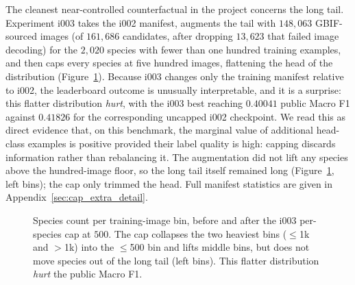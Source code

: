 The cleanest near-controlled counterfactual in the project concerns the long tail. Experiment
i003 takes the i002 manifest, augments the tail with $148{,}063$ GBIF-sourced images
(of $161{,}686$ candidates, after dropping $13{,}623$ that failed image decoding) for the
$2{,}020$ species with fewer than one hundred training examples, and then caps every species at
five hundred images, flattening the head of the distribution (Figure~\ref{fig:long_tail}).
Because i003 changes only the training manifest relative to i002, the leaderboard outcome is
unusually interpretable, and it is a surprise: this flatter distribution \emph{hurt}, with the
i003 best reaching $0.40041$ public Macro F1 against $0.41826$ for the corresponding uncapped
i002 checkpoint. We read this as direct evidence that, on this benchmark, the marginal value of
additional head-class examples is positive provided their label quality is high: capping discards
information rather than rebalancing it. The augmentation did not lift any species above the
hundred-image floor, so the long tail itself remained long (Figure~\ref{fig:long_tail}, left
bins); the cap only trimmed the head. Full manifest statistics are given in
Appendix~\ref{sec:cap_extra_detail}.

\begin{figure}[!htbp]
  \centering
  
  \caption{Species count per training-image bin, before and after the i003 per-species cap at $500$. The cap collapses the two heaviest bins ($\le$1k and $>$1k) into the $\le$500 bin and lifts middle bins, but does not move species out of the long tail (left bins). This flatter distribution \emph{hurt} the public Macro F1.}
  \label{fig:long_tail}
\end{figure}
